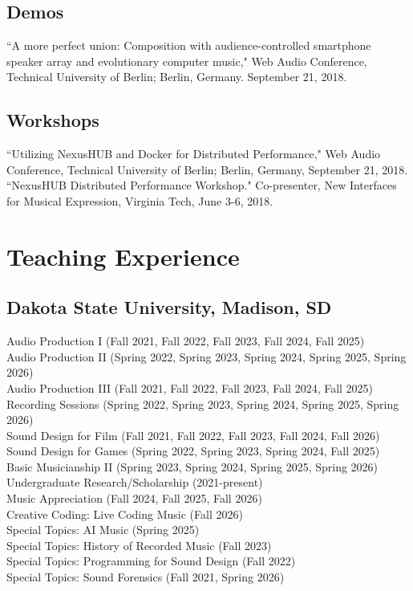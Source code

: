 \documentclass[12pt, a4paper]{article}
\newcommand{\years}[1]{\leavevmode\marginnote{\scriptsize #1}\ignorespaces}%
\begin{document}
\subsection*{Demos}
\years{2019} ``A more perfect union: Composition with audience-controlled smartphone speaker array and evolutionary computer music," Web Audio Conference, Technical University of Berlin; Berlin, Germany. September 21, 2018. \\

\subsection*{Workshops}
\years{2018} ``Utilizing NexusHUB and Docker for Distributed Performance," Web Audio Conference, Technical University of Berlin; Berlin, Germany, September 21, 2018. \\
``NexusHUB Distributed Performance Workshop." Co-presenter, New Interfaces for Musical Expression, Virginia Tech, June 3-6, 2018. \\




\section*{Teaching Experience}

\subsection*{Dakota State University, Madison, SD}

Audio Production I (Fall 2021, Fall 2022, Fall 2023, Fall 2024, Fall 2025)\\
Audio Production II (Spring 2022, Spring 2023, Spring 2024, Spring 2025, Spring 2026)\\
Audio Production III (Fall 2021, Fall 2022, Fall 2023, Fall 2024, Fall 2025)\\
Recording Sessions (Spring 2022, Spring 2023, Spring 2024, Spring 2025, Spring 2026)\\
Sound Design for Film (Fall 2021, Fall 2022, Fall 2023, Fall 2024, Fall 2026)\\
Sound Design for Games (Spring 2022, Spring 2023, Spring 2024, Fall 2025)\\
Basic Musicianship II (Spring 2023, Spring 2024, Spring 2025, Spring 2026)\\
Undergraduate Research/Scholarship (2021-present)\\
Music Appreciation (Fall 2024, Fall 2025, Fall 2026)\\
Creative Coding: Live Coding Music (Fall 2026)\\
Special Topics: AI Music (Spring 2025)\\
Special Topics: History of Recorded Music (Fall 2023)\\
Special Topics: Programming for Sound Design (Fall 2022)\\
Special Topics: Sound Forensics (Fall 2021, Spring 2026)\\
\end{document}
